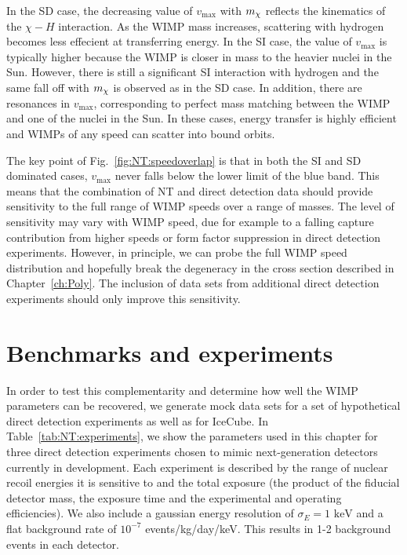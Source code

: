 In the SD case, the decreasing value of $v_\textrm{max}$ with $\mchi$ reflects the kinematics of the $\chi-H$ interaction. As the WIMP mass increases, scattering with hydrogen becomes less effecient at transferring energy. In the SI case, the value of $v_\textrm{max}$ is typically higher because the WIMP is closer in mass to the heavier nuclei in the Sun. However, there is still a significant SI interaction with hydrogen and the same fall off with $\mchi$ is observed as in the SD case. In addition, there are resonances in $v_\textrm{max}$, corresponding to perfect mass matching between the WIMP and one of the nuclei in the Sun. In these cases, energy transfer is highly efficient and WIMPs of any speed can scatter into bound orbits.

The key point of Fig.~\ref{fig:NT:speedoverlap} is that in both the SI and SD dominated cases, $v_\textrm{max}$ never falls below the lower limit of the blue band. This means that the combination of NT and direct detection data should provide sensitivity to the full range of WIMP speeds over a range of masses. The level of sensitivity may vary with WIMP speed, due for example to a falling capture contribution from higher speeds or form factor suppression in direct detection experiments. However, in principle, we can probe the full WIMP speed distribution and hopefully break the degeneracy in the cross section described in Chapter~\ref{ch:Poly}. The inclusion of data sets from additional direct detection experiments should only improve this sensitivity.




\section{Benchmarks and experiments}
\label{sec:NT:experiments}
In order to test this complementarity and determine how well the WIMP parameters can be recovered, we generate mock data sets for a set of hypothetical direct detection experiments as well as for IceCube. In Table~\ref{tab:NT:experiments}, we show the parameters used in this chapter for three direct detection experiments chosen to mimic next-generation detectors currently in development. Each experiment is described by the range of nuclear recoil energies it is sensitive to and the total exposure (the product of the fiducial detector mass, the exposure time and the experimental and operating efficiencies). We also include a gaussian energy resolution of $\sigma_E = 1 \textrm{ keV}$ and a flat background rate of $10^{-7}$ events/kg/day/keV. This results in 1-2 background events in each detector. 

